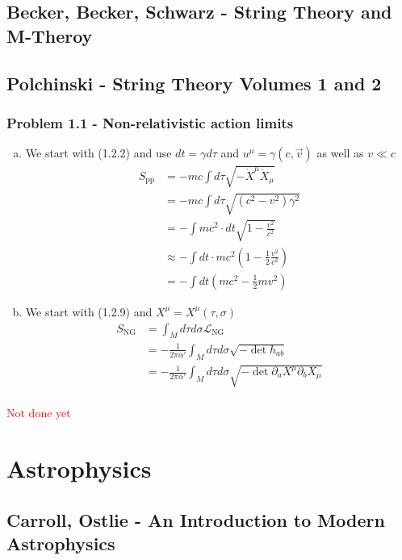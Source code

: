 \documentclass[10pt,a4paper]{book}
\theoremstyle{definition}
\begin{document}
\section{{\sc Becker, Becker, Schwarz} - String Theory and M-Theroy }

\section{{\sc Polchinski} - String Theory Volumes 1 and 2 }
\subsection{Problem 1.1 - Non-relativistic action limits}
\begin{enumerate}[(a)]
    \item We start with (1.2.2) and use $dt=\gamma d\tau$ and $u^\mu=\gamma(c,\vec{v})$ as well as $v\ll c$
    \begin{align}
        S_\text{pp}&=-mc\int d\tau\sqrt{-\dot X^\mu\dot X_\mu}\\
        &=-mc\int d\tau\sqrt{(c^2-v^2)\gamma^2}\\
        &=-\int mc^2\cdot dt\sqrt{1-\frac{v^2}{c^2}}\\
        &\approx-\int dt\cdot mc^2\left(1-\frac{1}{2}\frac{v^2}{c^2}\right)\\
        &=-\int dt\left(mc^2-\frac{1}{2}mv^2\right)
    \end{align}
    
    \item We start with (1.2.9) and $X^\mu=X^\mu(\tau,\sigma)$
    \begin{align}
        S_\text{NG}
        &=\int_Md\tau d\sigma \mathcal{L}_\text{NG}\\
        &=-\frac{1}{2\pi\alpha'}\int_Md\tau d\sigma \sqrt{-\det h_{ab}}\\
        &=-\frac{1}{2\pi\alpha'}\int_Md\tau d\sigma \sqrt{-\det \partial_aX^\mu\partial_bX_\mu}\\
    \end{align}
    
\end{enumerate}

\textcolor{red}{Not done yet}

\chapter{Astrophysics}
\section{{\sc Carroll, Ostlie} - An Introduction to Modern Astrophysics}
\end{document}
